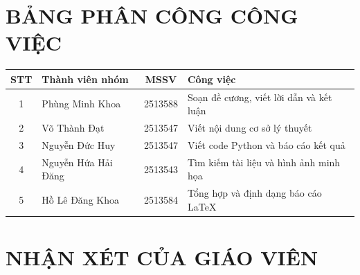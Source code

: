 \documentclass{report}
\begin{document}
\newpage

\chapter*{BẢNG PHÂN CÔNG CÔNG VIỆC}
\thispagestyle{empty}
\begin{table}[h!]
\centering
\renewcommand{\arraystretch}{1.5}
\begin{tabularx}{0.95\textwidth}{@{} cXcX @{}}
	\toprule
	\textbf{STT} & \textbf{Thành viên nhóm} & \textbf{MSSV} & \textbf{Công việc} \\
	\midrule
	1 & Phùng Minh Khoa & 2513588 & Soạn đề cương, viết lời dẫn và kết luận \\
	2 & Võ Thành Đạt & 2513547 & Viết nội dung cơ sở lý thuyết \\
	3 & Nguyễn Đức Huy & 2513547 & Viết code Python và báo cáo kết quả \\
	4 & Nguyễn Hứa Hải Đăng & 2513543 & Tìm kiếm tài liệu và hình ảnh minh họa \\
	5 & Hồ Lê Đăng Khoa & 2513584 & Tổng hợp và định dạng báo cáo LaTeX \\
	\bottomrule
\end{tabularx}
\end{table}
\newpage

\chapter*{NHẬN XÉT CỦA GIÁO VIÊN}
\thispagestyle{empty}
\noindent
{}
\newpage
\end{document}
